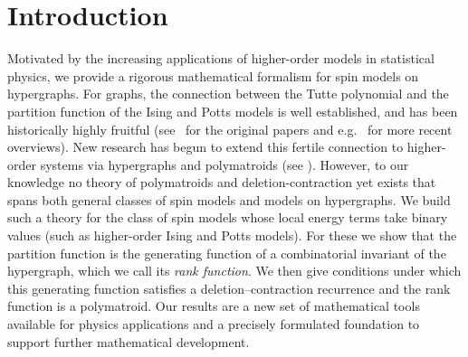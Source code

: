 \documentclass[11pt,reqno]{amsart}
\theoremstyle{plain}
\theoremstyle{definition}
\numberwithin{equation}{section}
\begin{document}
\section{Introduction}
\label{sec:intro}
Motivated by the increasing applications of higher-order models in statistical physics, we provide a rigorous mathematical formalism for spin models on hypergraphs.
For graphs, the connection between the Tutte polynomial and the partition function of the Ising and Potts models is well established, and has been historically highly fruitful (see~\cite{FK72} for the original papers and e.g.~\cite{Bax82, beaudin2010little, Big93, Bol98, zbMATH05956368, Loe10, Tut84, Wel93, WM00, Sok05} for more recent overviews). New research has begun to extend this fertile connection to higher-order systems via hypergraphs and polymatroids (see \cite{kalman2013version,  bernardi2022universal,  guan2023deletion, Berrekkal2026, chavez2021new}). However, to our knowledge no theory of polymatroids and deletion-contraction yet exists 
that spans both general classes of spin models and models on hypergraphs. We build such a theory for the class of spin models whose local energy terms take binary values (such as higher-order Ising and Potts models). For these we show that the partition function is the generating function of a combinatorial invariant of the hypergraph, which we call its \emph{rank function}. We then give conditions under which this generating function satisfies a deletion--contraction recurrence and the rank function is a polymatroid. Our results are a new set of mathematical tools available
for physics applications and a precisely formulated foundation to support further mathematical development.
\end{document}

